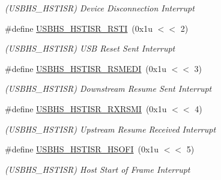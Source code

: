 \begin{DoxyCompactItemize}
\begin{DoxyCompactList}\small\item\em (U\+S\+B\+H\+S\+\_\+\+H\+S\+T\+I\+SR) Device Disconnection Interrupt \end{DoxyCompactList}\item 
\mbox{\label{group__SAMV71__USBHS_gaf84113b919c558bfeb00a82f0b34ceaa}} 
\#define \mbox{\hyperlink{group__SAMV71__USBHS_gaf84113b919c558bfeb00a82f0b34ceaa}{U\+S\+B\+H\+S\+\_\+\+H\+S\+T\+I\+S\+R\+\_\+\+R\+S\+TI}}~(0x1u $<$$<$ 2)
\begin{DoxyCompactList}\small\item\em (U\+S\+B\+H\+S\+\_\+\+H\+S\+T\+I\+SR) U\+SB Reset Sent Interrupt \end{DoxyCompactList}\item 
\mbox{\label{group__SAMV71__USBHS_ga09c9fce8f7ee07463c038713026e71a3}} 
\#define \mbox{\hyperlink{group__SAMV71__USBHS_ga09c9fce8f7ee07463c038713026e71a3}{U\+S\+B\+H\+S\+\_\+\+H\+S\+T\+I\+S\+R\+\_\+\+R\+S\+M\+E\+DI}}~(0x1u $<$$<$ 3)
\begin{DoxyCompactList}\small\item\em (U\+S\+B\+H\+S\+\_\+\+H\+S\+T\+I\+SR) Downstream Resume Sent Interrupt \end{DoxyCompactList}\item 
\mbox{\label{group__SAMV71__USBHS_gab6e204fe65d4c73c987271638fcdfdb6}} 
\#define \mbox{\hyperlink{group__SAMV71__USBHS_gab6e204fe65d4c73c987271638fcdfdb6}{U\+S\+B\+H\+S\+\_\+\+H\+S\+T\+I\+S\+R\+\_\+\+R\+X\+R\+S\+MI}}~(0x1u $<$$<$ 4)
\begin{DoxyCompactList}\small\item\em (U\+S\+B\+H\+S\+\_\+\+H\+S\+T\+I\+SR) Upstream Resume Received Interrupt \end{DoxyCompactList}\item 
\mbox{\label{group__SAMV71__USBHS_ga2e72394c9c97ef664be053cbd2c76bc5}} 
\#define \mbox{\hyperlink{group__SAMV71__USBHS_ga2e72394c9c97ef664be053cbd2c76bc5}{U\+S\+B\+H\+S\+\_\+\+H\+S\+T\+I\+S\+R\+\_\+\+H\+S\+O\+FI}}~(0x1u $<$$<$ 5)
\begin{DoxyCompactList}\small\item\em (U\+S\+B\+H\+S\+\_\+\+H\+S\+T\+I\+SR) Host Start of Frame Interrupt \end{DoxyCompactList}\item 

\end{DoxyCompactItemize}

